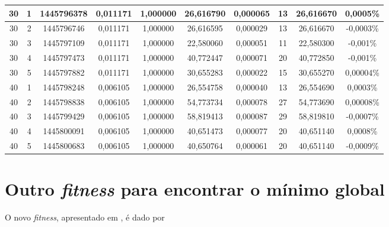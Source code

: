 \begin{landscape}
\begin{center}
\begin{table}[htbp]
\begin{tabular}{cccccccccc}
\hline
        30 &          1 & 1445796378 &   0,011171 &   1,000000 &  26,616790 &   0,000065 &         13 &  26,616670 &   0,0005\% \\
\hline
        30 &          2 & 1445796746 &   0,011171 &   1,000000 &  26,616595 &   0,000029 &         13 &  26,616670 &  -0,0003\% \\
\hline
        30 &          3 & 1445797109 &   0,011171 &   1,000000 &  22,580060 &   0,000051 &         11 &  22,580300 &   -0,001\% \\
\hline
        30 &          4 & 1445797473 &   0,011171 &   1,000000 &  40,772447 &   0,000071 &         20 &  40,772850 &   -0,001\% \\
\hline
        30 &          5 & 1445797882 &   0,011171 &   1,000000 &  30,655283 &   0,000022 &         15 &  30,655270 &  0,00004\% \\
\hline
        40 &          1 & 1445798248 &   0,006105 &   1,000000 &  26,554758 &   0,000040 &         13 &  26,554690 &   0,0003\% \\
\hline
        40 &          2 & 1445798838 &   0,006105 &   1,000000 &  54,773734 &   0,000078 &         27 &  54,773690 &  0,00008\% \\
\hline
        40 &          3 & 1445799429 &   0,006105 &   1,000000 &  58,819413 &   0,000087 &         29 &  58,819810 &  -0,0007\% \\
\hline
        40 &          4 & 1445800091 &   0,006105 &   1,000000 &  40,651473 &   0,000077 &         20 &  40,651140 &   0,0008\% \\
\hline
        40 &          5 & 1445800683 &   0,006105 &   1,000000 &  40,650764 &   0,000061 &         20 &  40,651140 &  -0,0009\% \\
\hline \hline
\end{tabular}
\end{table}  
\end{center}
\end{landscape}

\newpage
\section{Outro \textit{fitness} para encontrar o mínimo global}

	O novo \emph{fitness}, apresentado em \cite{metodo2011}, é dado por
	
